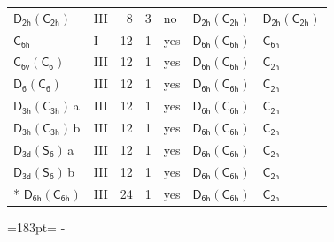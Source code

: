 \documentclass[10pt,a4paper]{article}
\newcommand{\needspace}[1]{\par\penalty-100\begingroup\dimen0=#1\relax\dimen2=\pagegoal
  \advance\dimen2-\pagetotal\ifdim\dimen0>\dimen2\relax\ifdim\dimen2>0pt\vfil\break\fi\fi
  \endgroup}
\numberwithin{equation}{section}
\newcommand{\grp}[1]{\mathsf{#1}}
\newcommand{\clsletter}[1]{\,{\scriptsize\color{black!55}#1}}
\begin{document}
{\begin{longtable}{@{}llrrlll@{}}
\href{D2h-C2h.pdf}{$\grp{D_{2h}}(\grp{C_{2h}})$} & III & 8 & 3 & no & \href{D2h-C2h.pdf}{$\grp{D_{2h}}(\grp{C_{2h}})$} & \href{D2h-C2h.pdf}{$\grp{D_{2h}}(\grp{C_{2h}})$}\\
\href{../../../rotation/data/pdf/C6h.pdf}{$\grp{C_{6h}}$} & I & 12 & 1 & yes & \href{D6h-C6h.pdf}{$\grp{D_{6h}}(\grp{C_{6h}})$} & \href{../../../rotation/data/pdf/C6h.pdf}{$\grp{C_{6h}}$}\\
\href{C6v-C6.pdf}{$\grp{C_{6v}}(\grp{C_{6}})$} & III & 12 & 1 & yes & \href{D6h-C6h.pdf}{$\grp{D_{6h}}(\grp{C_{6h}})$} & \href{../../../rotation/data/pdf/C2h.pdf}{$\grp{C_{2h}}$}\\
\href{D6-C6.pdf}{$\grp{D_{6}}(\grp{C_{6}})$} & III & 12 & 1 & yes & \href{D6h-C6h.pdf}{$\grp{D_{6h}}(\grp{C_{6h}})$} & \href{../../../rotation/data/pdf/C2h.pdf}{$\grp{C_{2h}}$}\\
\href{D3h-C3h.pdf}{$\grp{D_{3h}}(\grp{C_{3h}})$}\clsletter{a} & III & 12 & 1 & yes & \href{D6h-C6h.pdf}{$\grp{D_{6h}}(\grp{C_{6h}})$} & \href{../../../rotation/data/pdf/C2h.pdf}{$\grp{C_{2h}}$}\\
\href{D3h-C3h.pdf}{$\grp{D_{3h}}(\grp{C_{3h}})$}\clsletter{b} & III & 12 & 1 & yes & \href{D6h-C6h.pdf}{$\grp{D_{6h}}(\grp{C_{6h}})$} & \href{../../../rotation/data/pdf/C2h.pdf}{$\grp{C_{2h}}$}\\
\href{D3d-S6.pdf}{$\grp{D_{3d}}(\grp{S_{6}})$}\clsletter{a} & III & 12 & 1 & yes & \href{D6h-C6h.pdf}{$\grp{D_{6h}}(\grp{C_{6h}})$} & \href{../../../rotation/data/pdf/C2h.pdf}{$\grp{C_{2h}}$}\\
\href{D3d-S6.pdf}{$\grp{D_{3d}}(\grp{S_{6}})$}\clsletter{b} & III & 12 & 1 & yes & \href{D6h-C6h.pdf}{$\grp{D_{6h}}(\grp{C_{6h}})$} & \href{../../../rotation/data/pdf/C2h.pdf}{$\grp{C_{2h}}$}\\*
\href{D6h-C6h.pdf}{$\grp{D_{6h}}(\grp{C_{6h}})$} & III & 24 & 1 & yes & \href{D6h-C6h.pdf}{$\grp{D_{6h}}(\grp{C_{6h}})$} & \href{../../../rotation/data/pdf/C2h.pdf}{$\grp{C_{2h}}$}\\
\bottomrule\end{longtable}}
\needspace{183pt}
\end{document}
